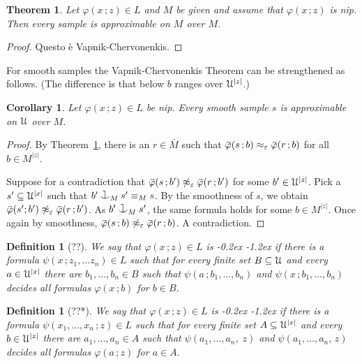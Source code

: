 \documentclass[10pt,openany]{article}
\newcommand{\sbar}[1]{\mkern 3mu\overline{\mkern-3mu#1\mkern-1mu}\mkern 1mu}
\def\cnonfork{\mathbin{\raise1.8ex\rlap{\kern0.6ex\rule{0.6ex}{0.1ex}}
\rlap{\kern1.1ex\rule{0.1ex}{1.9ex}}\raise-0.3ex\hbox{$\smile$} } }
\def\U{\EuScript U}
\def\phi{\varphi}
\def\epsilon{\varepsilon}
\newcounter{thm}[section]
\theoremstyle{mio}
\newtheorem{theorem}[thm]{Theorem}
\newtheorem{corollary}[thm]{Corollary}
\newtheorem{definition}[thm]{Definition}
\theoremstyle{liscio}
\def\QED{\noindent\nolinebreak[4]\hspace{\stretch{1}}\rlap{\ \ $\Box$}\medskip}
\renewcommand*{\emph}[1]{%
   \kern-0.2ex 
   \smash{\tikz[baseline]
   \node[ rectangle, fill=emphcolor, rounded corners, 
          inner xsep=.3ex, inner ysep=.2ex, anchor=base,
          minimum height = 3ex
         ]{#1};
   }
   \kern-1.2ex 
}
\begin{document}
\begin{theorem}\label{thm_VC}
  Let $\phi(x\,;z)\in L$ and $M$ be given and assume that $\phi(x\,;z)$ is nip.
  Then every sample is approximable on $M$ over $M$.
\end{theorem}

\begin{proof}
  Questo è Vapnik-Chervonenkis.
\end{proof}

For smooth samples the Vapnik-Chervonenkis Theorem can be strengthened as follows. (The difference is that below $b$ ranges over $\U^{|z|}$.)

\begin{corollary}
  Let  $\phi(x\,;z)\in L$ be nip.
  Every smooth sample $s$ is approximable on $\U$ over $M$.
\end{corollary}

\begin{proof}
  By Theorem~\ref{thm_VC}, there is an $r\in \bar M$ such that $\sbar\phi(s\,;b)\approx_\epsilon\sbar\phi(r\,;b)$ for all $b\in M^{|z|}$.

  Suppose for a contradiction that $\sbar\phi(s\,;b')\not\approx_\epsilon\sbar\phi(r\,;b')$ for some $b'\in\U^{|z|}$.
  Pick a  $s'\subseteq\U^{|x|}$ such that $b'\cnonfork_{M}s'\equiv_Ms$.
  By the smoothness of $s$, we obtain $\sbar\phi(s';b')\not\approx_\epsilon\sbar\phi(r\,;b')$.
  As $b'\cnonfork_{M}s'$, the same formula holds for some $b\in M^{|z|}$.
  Once again by smoothness, $\sbar\phi(s\,;b)\not\approx_\epsilon\sbar\phi(r\,;b)$.
  A contradiction.
\end{proof}

\begin{definition}[??]
  We say that $\phi(x\,;z)\in L$ is \emph{distal\/} if there is a formula $\psi(x\,;z_1,\dots z_n)\in L$ such that for every finite set $B\subseteq\U$ and every $a\in\U^{|x|}$ there are $b_1,\dots,b_n\in B$ such that $\psi(a\,;b_1,\dots,b_n)$ and $\psi(x\,;b_1,\dots,b_n)$ decides all formulas $\phi(x\,; b)$ for $b\in B$.\QED
\end{definition}

\begin{definition}[??*]
  We say that $\phi(x\,;z)\in L$ is \emph{distal\/} if there is a formula $\psi(x_1,\dots,x_n\,;z)\in L$ such that for every finite set $A\subseteq\U^{|x|}$ and every $b\in\U^{|z|}$ there are $a_1,\dots,a_n\in A$ such that $\psi(a_1,\dots,a_n,\;z)$ and $\psi(a_1,\dots,a_n,\,z)$ decides all formulas $\phi(a\,; z)$ for $a\in A$.\QED
\end{definition}
\end{document}
